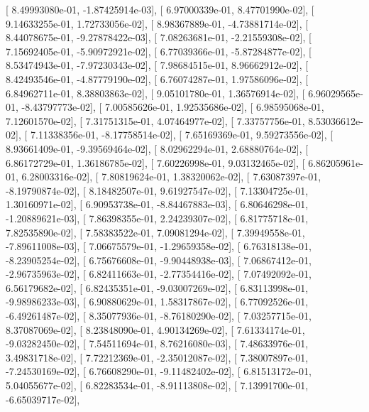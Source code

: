 \documentclass{article}
\begin{document}
       [  8.49993080e-01,  -1.87425914e-03],
       [  6.97000339e-01,   8.47701990e-02],
       [  9.14633255e-01,   1.72733056e-02],
       [  8.98367889e-01,  -4.73881714e-02],
       [  8.44078675e-01,  -9.27878422e-03],
       [  7.08263681e-01,  -2.21559308e-02],
       [  7.15692405e-01,  -5.90972921e-02],
       [  6.77039366e-01,  -5.87284877e-02],
       [  8.53474943e-01,  -7.97230343e-02],
       [  7.98684515e-01,   8.96662912e-02],
       [  8.42493546e-01,  -4.87779190e-02],
       [  6.76074287e-01,   1.97586096e-02],
       [  6.84962711e-01,   8.38803863e-02],
       [  9.05101780e-01,   1.36576914e-02],
       [  6.96029565e-01,  -8.43797773e-02],
       [  7.00585626e-01,   1.92535686e-02],
       [  6.98595068e-01,   7.12601570e-02],
       [  7.31751315e-01,   4.07464977e-02],
       [  7.33757756e-01,   8.53036612e-02],
       [  7.11338356e-01,  -8.17758514e-02],
       [  7.65169369e-01,   9.59273556e-02],
       [  8.93661409e-01,  -9.39569464e-02],
       [  8.02962294e-01,   2.68880764e-02],
       [  6.86172729e-01,   1.36186785e-02],
       [  7.60226998e-01,   9.03132465e-02],
       [  6.86205961e-01,   6.28003316e-02],
       [  7.80819624e-01,   1.38320062e-02],
       [  7.63087397e-01,  -8.19790874e-02],
       [  8.18482507e-01,   9.61927547e-02],
       [  7.13304725e-01,   1.30160971e-02],
       [  6.90953738e-01,  -8.84467883e-03],
       [  6.80646298e-01,  -1.20889621e-03],
       [  7.86398355e-01,   2.24239307e-02],
       [  6.81775718e-01,   7.82535890e-02],
       [  7.58383522e-01,   7.09081294e-02],
       [  7.39949558e-01,  -7.89611008e-03],
       [  7.06675579e-01,  -1.29659358e-02],
       [  6.76318138e-01,  -8.23905254e-02],
       [  6.75676608e-01,  -9.90448938e-03],
       [  7.06867412e-01,  -2.96735963e-02],
       [  6.82411663e-01,  -2.77354416e-02],
       [  7.07492092e-01,   6.56179682e-02],
       [  6.82435351e-01,  -9.03007269e-02],
       [  6.83113998e-01,  -9.98986233e-03],
       [  6.90880629e-01,   1.58317867e-02],
       [  6.77092526e-01,  -6.49261487e-02],
       [  8.35077936e-01,  -8.76180290e-02],
       [  7.03257715e-01,   8.37087069e-02],
       [  8.23848090e-01,   4.90134269e-02],
       [  7.61334174e-01,  -9.03282450e-02],
       [  7.54511694e-01,   8.76216080e-03],
       [  7.48633976e-01,   3.49831718e-02],
       [  7.72212369e-01,  -2.35012087e-02],
       [  7.38007897e-01,  -7.24530169e-02],
       [  6.76608290e-01,  -9.11482402e-02],
       [  6.81513172e-01,   5.04055677e-02],
       [  6.82283534e-01,  -8.91113808e-02],
       [  7.13991700e-01,  -6.65039717e-02],
\end{document}
